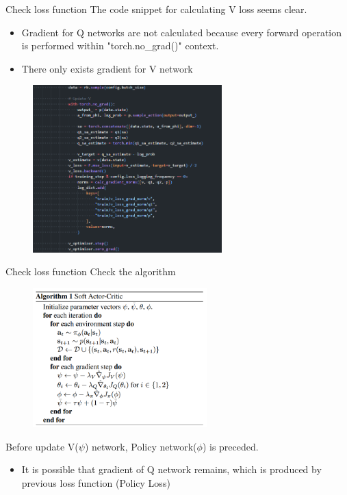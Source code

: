 \documentclass[8pt]{beamer}
\begin{document}
\begin{frame}{Check loss function}
    The code snippet for calculating V loss seems clear.

    \begin{itemize}
        \item Gradient for Q networks are not calculated because every forward operation is performed within "torch.no\_grad()" context.
        \item There only exists gradient for V network
    \end{itemize}

    \begin{figure}
        \centering
        \includegraphics[width=0.65\textwidth]{fig5.png}
    \end{figure}
\end{frame}

\begin{frame}{Check loss function}
    Check the algorithm
    \begin{figure}
        \centering
        \includegraphics[width=0.6\textwidth]{fig6.png}
    \end{figure}
    Before update V($\psi$) network, Policy network($\phi$) is preceded.
    \begin{itemize}
        \item It is possible that gradient of Q network remains, which is produced by previous loss function (Policy Loss)
    \end{itemize}
\end{frame}
\end{document}
